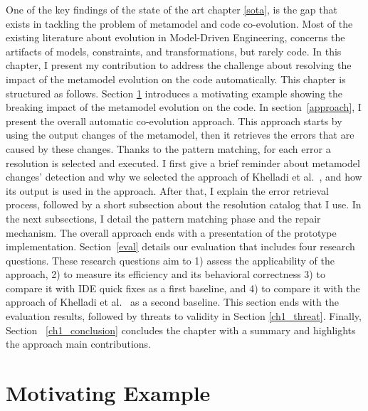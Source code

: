 One of the key findings of the state of the art chapter \ref{sota}, is the gap that exists in tackling the problem of metamodel and code co-evolution. Most of the existing literature about evolution in Model-Driven Engineering, concerns the artifacts of models, constraints, and transformations, but rarely code. In this chapter, I present my contribution to address the challenge  about resolving the impact of the metamodel evolution on the code automatically. 
This chapter is structured as follows. Section \ref{example} introduces a motivating example showing the breaking impact of the metamodel evolution on the code. 
In section~\ref{approach}, I present the overall automatic co-evolution approach. This approach starts by using the output changes of the metamodel, then it retrieves the errors that are caused by these changes. Thanks to the pattern matching, for each error a resolution is selected and executed. I first give a brief reminder about metamodel changes' detection and why we selected the approach of Khelladi et al.~\cite{khelladi2016detecting}, and how its output is used in the approach. After that, I explain the error retrieval process, followed by a short subsection about the resolution catalog that I use. In the next subsections, I detail the pattern matching phase and the repair mechanism. The overall approach ends with a presentation of the prototype implementation.
Section~\ref{eval} details our evaluation that includes four research questions. These research questions aim to 1) assess the applicability of the approach, 2) to measure its efficiency and its behavioral correctness 3) to compare it with IDE quick fixes as a first baseline, and 4) to compare it with the approach of Khelladi et al.~\cite{Khelladi2020} as a second baseline. This section ends with the evaluation results, followed by threats to validity in Section \ref{ch1_threat}. Finally, Section~ \ref{ch1_conclusion} concludes the chapter with a summary and highlights the approach main contributions. %
\label{sec: ap1_changedetection}

\section{Motivating Example}\label{example}

